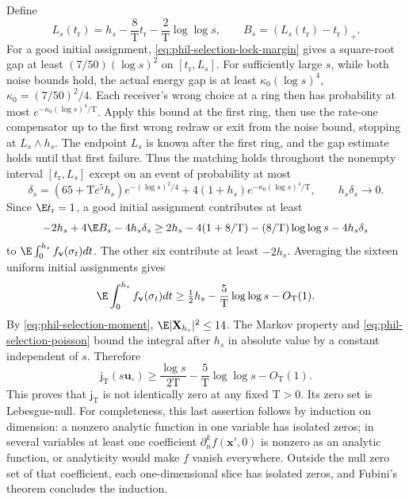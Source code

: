 Define
\[
 L_s(t_{\mathrm r})=h_s-\frac8{\mathrm T}t_{\mathrm r}
                         -\frac2{\mathrm T}\log\log s,\qquad
 B_s=(L_s(t_{\mathrm r})-t_{\mathrm r})_+.
\]
For a good initial assignment, \cref{eq:phil-selection-lock-margin}
gives a square-root gap at least \((7/50)(\log s)^2\) on
\([t_{\mathrm r},L_s]\). For sufficiently large \(s\), while both noise bounds hold,
the actual energy gap is at least
\(\kappa_0(\log s)^4\), \(\kappa_0=(7/50)^2/4\).
Each receiver's wrong choice at a ring then has probability at most
\(e^{-\kappa_0(\log s)^4/\mathrm T}\). Apply this bound at the first
ring, then use the rate-one compensator up to the first wrong redraw or
exit from the noise bound, stopping at \(L_s\wedge h_s\).
The endpoint \(L_s\) is known after the first ring, and the gap estimate
holds until that first failure. Thus the matching holds throughout the
nonempty interval \([t_{\mathrm r},L_s]\) except on an event of
probability at most
\begin{equation}
 \delta_s=(65+\mathrm Te^5h_s)e^{-(\log s)^2/4}
       +4(1+h_s)e^{-\kappa_0(\log s)^4/\mathrm T},
 \qquad h_s\delta_s\longrightarrow0.
\label{eq:phil-selection-lock-failure}
\end{equation}
Since \(\E t_{\mathrm r}=1\), a good initial assignment contributes at
least
\[
 -2h_s+4\E B_s-4h_s\delta_s
 \ge2h_s-4(1+8/\mathrm T)-(8/\mathrm T)\log\log s-4h_s\delta_s
\]
to \(\E\int_0^{h_s}f_{\mathbf v}(\sigma_t)dt\). The other six contribute
at least \(-2h_s\). Averaging the sixteen uniform initial assignments gives
\[
 \E\int_0^{h_s}f_{\mathbf v}(\sigma_t)dt
 \ge\tfrac12h_s-\frac5{\mathrm T}\log\log s-O_{\mathrm T}(1).
\]
By \cref{eq:phil-selection-moment},
\(\E|\mathbf X_{h_s}|^2\le14\). The Markov property and
\cref{eq:phil-selection-poisson} bound the integral after \(h_s\) in
absolute value by a constant independent of \(s\). Therefore
\begin{equation}
 \mathsf j_{\mathrm T}(s\mathbf u_\circ)
 \ge\frac{\log s}{2\mathrm T}
       -\frac5{\mathrm T}\log\log s-O_{\mathrm T}(1).
\label{eq:phil-selection-nonvanishing}
\end{equation}
This proves that \(\mathsf j_{\mathrm T}\) is not identically zero at any
fixed \(\mathrm T>0\). Its zero set is Lebesgue-null. For completeness,
this last assertion follows by induction on dimension: a nonzero analytic
function in one variable has isolated zeros; in several variables at least
one coefficient \(\partial_n^kf(\mathbf x',0)\) is nonzero as an analytic
function, or analyticity would make \(f\) vanish everywhere. Outside the
null zero set of that coefficient, each one-dimensional slice has isolated
zeros, and Fubini's theorem concludes the induction.

